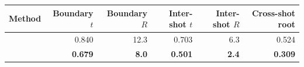 \begin{tabular}{lrrrrr}
\toprule
Method & Boundary $t$ & Boundary $R$ & Inter-shot $t$ & Inter-shot $R$ & Cross-shot root \\
\midrule
\humanthree{} & 0.840 & 12.3 & 0.703 & 6.3 & 0.524 \\
\method{} & \textbf{0.679} & \textbf{8.0} & \textbf{0.501} & \textbf{2.4} & \textbf{0.309} \\
\bottomrule
\end{tabular}

